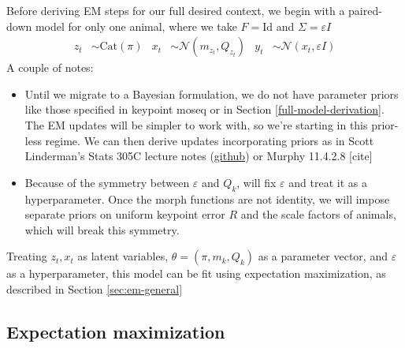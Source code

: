 \documentclass{article}         %
\newcommand{\eps}{\varepsilon}
\begin{document}
Before deriving EM steps for our full desired context, we begin with a paired-down model for only one animal, where we take $F = \mathrm{Id}$ and $\Sigma = \eps I$
\begin{align}
    z_t & \sim \text{Cat}(\pi) &
    x_t & \sim \mathcal{N}(m_{z_t}, Q_{z_t}) &
    y_t & \sim \mathcal{N}(x_t, \eps I)
\end{align}
A couple of notes:
\begin{itemize}
    \item Until we migrate to a Bayesian formulation, we do not have parameter priors like those specified in keypoint moseq or in Section \ref{full-model-derivation}. The EM updates will be simpler to work with, so we're starting in this prior-less regime. We can then derive updates incorporating priors as in Scott Linderman's Stats 305C lecture notes (\href{https://github.com/slinderman/stats305c/blob/spring2023/slides/lecture08-em.pdf}{github}) or Murphy 11.4.2.8 [cite]
    \item Because of the symmetry between $\eps$ and $Q_k$, will fix $\eps$ and treat it as a hyperparameter. Once the morph functions are not identity, we will impose separate priors on uniform keypoint error $R$ and the scale factors of animals, which will break this symmetry.
\end{itemize}
Treating $z_t, x_t$ as latent variables, $\theta = (\pi, m_k, Q_k)$ as a parameter vector, and $\eps$ as a hyperparameter, this model can be fit using expectation maximization, as described in Section \ref{sec:em-general}


\label{sec:em-general}
\subsection{Expectation maximization}
\end{document}
